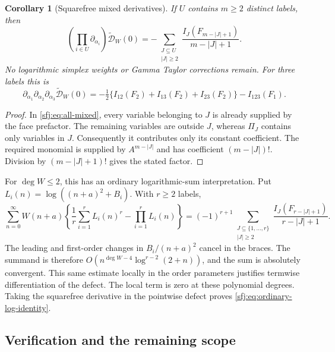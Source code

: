 \documentclass[11pt,letterpaper]{article}
\numberwithin{equation}{section}
\newtheorem{corollary}[theorem]{Corollary}
\theoremstyle{definition}
\theoremstyle{remark}
\begin{document}
\begin{corollary}[Squarefree mixed derivatives]
\label{sfj:cor:squarefree}
If $U$ contains $m\ge2$ distinct labels, then
\begin{equation}\label{sfj:eq:squarefree}
 \boxed{\displaystyle
 \left(\prod_{i\in U}\partial_{\alpha_i}\right)
             \widetilde{\mathscr D}_W(0)
 =-\sum_{\substack{J\subseteq U\\|J|\ge2}}
           \frac{I_J(F_{m-|J|+1})}{m-|J|+1}.}
\end{equation}
No logarithmic simplex weights or Gamma Taylor corrections remain.
For three labels this is
\[
 \partial_{\alpha_1}\partial_{\alpha_2}\partial_{\alpha_3}
          \widetilde{\mathscr D}_W(0)
 =-\tfrac12\{I_{12}(F_2)+I_{13}(F_2)+I_{23}(F_2)\}
                                      -I_{123}(F_1).
\]
\end{corollary}
\begin{proof}
In \eqref{sfj:eq:all-mixed}, every variable belonging to $J$ is
already supplied by the face prefactor.  The remaining variables are
outside $J$, whereas $\Pi_J$ contains only variables in $J$.
Consequently it contributes only its constant coefficient.  The
required monomial is supplied by $A^{m-|J|}$ and has coefficient
$(m-|J|)!$.  Division by $(m-|J|+1)!$ gives the stated factor.
\end{proof}

For $\deg W\le2$, this has an ordinary logarithmic-sum interpretation.
Put $L_i(n)=\log((n+a)^2+B_i)$.  With $r\ge2$ labels,
\begin{equation}\label{sfj:eq:ordinary-log-identity}
 \sum_{n=0}^\infty W(n+a)
    \left\{\frac1r\sum_{i=1}^rL_i(n)^r-\prod_{i=1}^rL_i(n)\right\}
 =(-1)^{r+1}
      \sum_{\substack{J\subseteq\{1,\ldots,r\}\\|J|\ge2}}
           \frac{I_J(F_{r-|J|+1})}{r-|J|+1}.
\end{equation}
The leading and first-order changes in $B_i/(n+a)^2$ cancel in the
braces.  The summand is therefore
$O(n^{\deg W-4}\log^{r-2}(2+n))$, and the sum is absolutely
convergent.  This same estimate locally in the order parameters
justifies termwise differentiation of the defect.  The local term is
zero at these polynomial degrees.  Taking the squarefree derivative
in the pointwise defect proves \eqref{sfj:eq:ordinary-log-identity}.

\subsection{Verification and the remaining scope}
\end{document}
